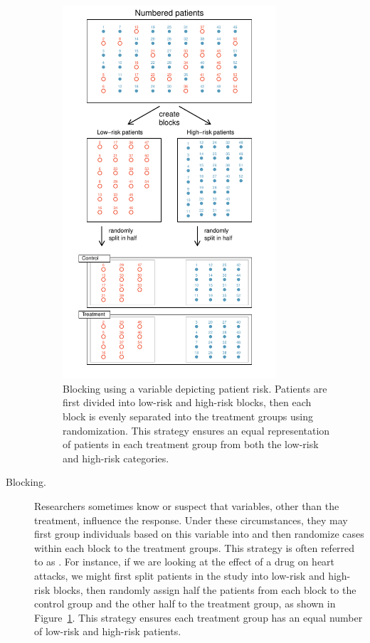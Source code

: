 \begin{description}
\begin{figure}
\centering
\includegraphics[width=0.78\textwidth]{ch_intro_to_data/figures/figureShowingBlocking/figureShowingBlocking}
\caption{Blocking using a variable depicting patient risk. Patients are first divided into low-risk and high-risk blocks, then each block is evenly separated into the treatment groups using randomization. This strategy ensures an equal representation of patients in each treatment group from both the low-risk and high-risk categories.}
\label{figureShowingBlocking}
\end{figure}

\item[Blocking.] Researchers sometimes know or suspect that variables, other than the treatment, influence the response. Under these circumstances, they may first group individuals based on this variable into  and then randomize cases within each block to the treatment groups. This strategy is often referred to as . For instance, if we are looking at the effect of a drug on heart attacks, we might first split patients in the study into low-risk and high-risk blocks, then randomly assign half the patients from each block to the control group and the other half to the treatment group, as shown in Figure~\ref{figureShowingBlocking}. This strategy ensures each treatment group has an equal number of low-risk and high-risk patients.
\end{description}

